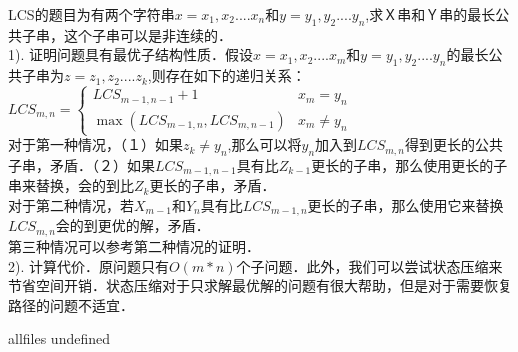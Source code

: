 \documentclass[a4paper,10pt]{article}
\begin{document}
\begin{CJK}{UTF8}{gbsn}     %

\else

LCS的题目为有两个字符串$x = x_{1}, x_{2}....x_{n}$和$y = y_{1}, y_{2}....y_{n}$,求Ｘ串和Ｙ串的最长公共子串，这个子串可以是非连续的．\\

1).	证明问题具有最优子结构性质．假设$x = x_{1}, x_{2}....x_{m}$和$y = y_{1}, y_{2}....y_{n}$的最长公共子串为$z = z_{1}, z_{2}....z_{k}$,则存在如下的递归关系：\\

$LCS_{m,n}=\left\{\begin{matrix}
		LCS_{m-1,n-1} + 1 & x_{m}= y_{n}\\ 
		\max (LCS_{m-1,n},LCS_{m,n-1}) & x_{m} \neq y_{n}
	\end{matrix}\right.$\\

对于第一种情况，（１）如果$z_{k} \neq y_{n}$,那么可以将$y_{n}$加入到$LCS_{m,n}$得到更长的公共子串，矛盾．（２）如果$LCS_{m-1,n-1}$具有比$Z_{k-1}$更长的子串，那么使用更长的子串来替换，会的到比$Z_{k}$更长的子串，矛盾．\\

对于第二种情况，若$X_{m-1}$和$Y_{n}$具有比$LCS_{m-1,n}$更长的子串，那么使用它来替换$LCS_{m,n}$会的到更优的解，矛盾．\\

第三种情况可以参考第二种情况的证明．\\

2).	计算代价．原问题只有$O(m \ast n)$个子问题．此外，我们可以尝试状态压缩来节省空间开销．状态压缩对于只求解最优解的问题有很大帮助，但是对于需要恢复路径的问题不适宜．\\

\fi

\ifx allfiles undefined
\end{CJK}
\end{document}
